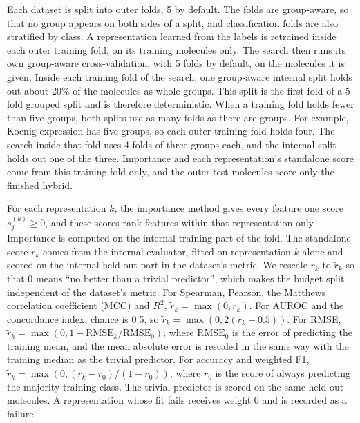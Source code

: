 Each dataset is split into outer folds, 5 by default. The folds are group-aware, so that no group appears on both sides of a split, and classification folds are also stratified by class. A representation learned from the labels is retrained inside each outer training fold, on its training molecules only. The search then runs its own group-aware cross-validation, with 5 folds by default, on the molecules it is given. Inside each training fold of the search, one group-aware internal split holds out about 20\% of the molecules as whole groups. This split is the first fold of a 5-fold grouped split and is therefore deterministic. When a training fold holds fewer than five groups, both splits use as many folds as there are groups. For example, Koenig expression has five groups, so each outer training fold holds four. The search inside that fold uses 4 folds of three groups each, and the internal split holds out one of the three. Importance and each representation's standalone score come from this training fold only, and the outer test molecules score only the finished hybrid.

For each representation $k$, the importance method gives every feature one score $s^{(k)}_j \ge 0$, and these scores rank features within that representation only. Importance is computed on the internal training part of the fold. The standalone score $r_k$ comes from the internal evaluator, fitted on representation $k$ alone and scored on the internal held-out part in the dataset's metric. We rescale $r_k$ to $\tilde r_k$ so that 0 means ``no better than a trivial predictor'', which makes the budget split independent of the dataset's metric. For Spearman, Pearson, the Matthews correlation coefficient (MCC) and $R^2$, $\tilde r_k = \max(0, r_k)$. For AUROC and the concordance index, chance is 0.5, so $\tilde r_k = \max(0, 2(r_k - 0.5))$. For RMSE, $\tilde r_k = \max(0, 1 - \mathrm{RMSE}_k/\mathrm{RMSE}_0)$, where $\mathrm{RMSE}_0$ is the error of predicting the training mean, and the mean absolute error is rescaled in the same way with the training median as the trivial predictor. For accuracy and weighted F1, $\tilde r_k = \max(0, (r_k - r_0)/(1 - r_0))$, where $r_0$ is the score of always predicting the majority training class. The trivial predictor is scored on the same held-out molecules. A representation whose fit fails receives weight 0 and is recorded as a failure.

